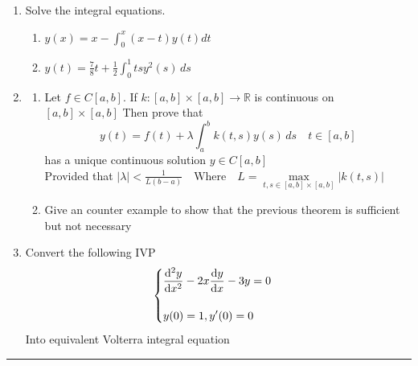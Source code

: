 \documentclass[]{article}
\begin{document}
\begin{enumerate}
    \item Solve the integral equations.
          \vspace*{.2cm}
          \begin{enumerate}
              \item $\displaystyle  y(x)=x-\int_{0}^{x} (x-t) y(t)dt $
                    \vspace*{.1cm}
              \item  $\displaystyle y(t)=\frac{7}{8}t+\frac{1}{2} \int_0^1 ts y^2(s) \,ds$
          \end{enumerate}
          \vspace*{.4cm}
    \item

          \begin{enumerate}
              \item Let $\displaystyle f \in C[a,b]$. If $k:[a,b]\times[a,b] \rightarrow \mathbb{R}$ is continuous on $[a,b]\times[a,b]$ Then prove that
                    \[
                        y(t) = f(t) + \lambda \int_a^b k(t,s) y(s) \,ds \quad t\in[a,b]
                    \]
                    has a unique continuous solution $y\in C[a,b]$\\
                    Provided that
                    \(
                    \displaystyle |\lambda|< \frac{1}{L(b-a)} \quad \text{Where}\quad L= \max\limits_{t,s\in [a,b]\times[a,b]} |k(t,s)|
                    \)
                    \vspace*{.1cm}
              \item Give an counter example to show that the previous theorem is sufficient but not necessary
          \end{enumerate}
          \vspace*{.4cm}
    \item Convert the following IVP\\
          \[
              \begin{cases}
                  \displaystyle \dv[2]{y}{x} -2x \dv{y}{x} -3y =0 \\\\
                  \displaystyle y(0) =1 , y'(0)=0                 \\
              \end{cases}
          \]
          Into equivalent Volterra integral equation
\end{enumerate}
\vspace*{\fill}
\hrule
\end{document}
